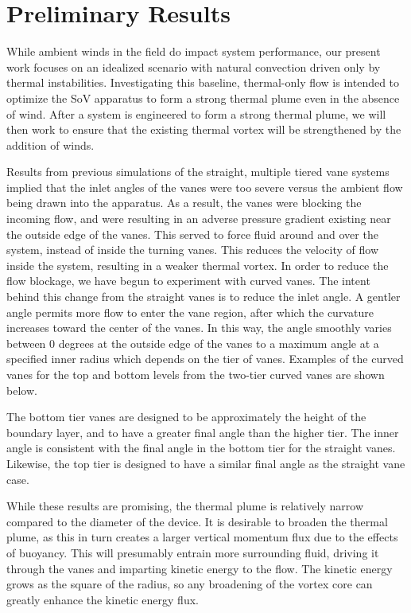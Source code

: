  
\section{Preliminary Results}
\label{sec:result}

While ambient winds in the field do impact system performance, our present work focuses on 
an idealized scenario with natural convection driven only by thermal instabilities. Investigating 
this baseline, thermal-only flow is intended to optimize the SoV apparatus to form a strong 
thermal plume even in the absence of wind. After a system is engineered to form a strong 
thermal plume, we will then work to ensure that the existing thermal vortex will be strengthened 
by the addition of winds.    

Results from previous simulations of the straight, multiple tiered vane systems implied that 
the inlet angles of the vanes were too severe versus the ambient flow being drawn into the 
apparatus. As a result, the vanes were blocking the incoming flow, and were resulting in an 
adverse pressure gradient existing near the outside edge of the vanes. This served to force fluid 
around and over the system, instead of inside the turning vanes. This reduces the velocity of flow 
inside the system, resulting in a weaker thermal vortex. 
In order to reduce the flow blockage, we have begun to experiment with curved vanes. The 
intent behind this change from the straight vanes is to reduce the inlet angle. A gentler angle 
permits more flow to enter the vane region, after which the curvature increases toward the center 
of the vanes. In this way, the angle smoothly varies between 0 degrees at the outside edge of the 
vanes to a maximum angle at a specified inner radius which depends on the tier of vanes. 
Examples of the curved vanes for the top and bottom levels from the two-tier curved vanes are 
shown below. 

The bottom tier vanes are designed to be approximately the height of the boundary layer, and 
to have a greater final angle than the higher tier. The inner angle is consistent with the final angle 
in the bottom tier for the straight vanes. Likewise, the top tier is designed to have a similar final 
angle as the straight vane case.

While these results are promising, the thermal plume is relatively narrow compared to the 
diameter of the device. It is desirable to broaden the thermal plume, as this in turn creates a 
larger vertical momentum flux due to the effects of buoyancy. This will presumably entrain more 
surrounding fluid, driving it through the vanes and imparting kinetic energy to the flow. The 
kinetic energy grows as the square of the radius, so any broadening of the vortex core can greatly 
enhance the kinetic energy flux. 

